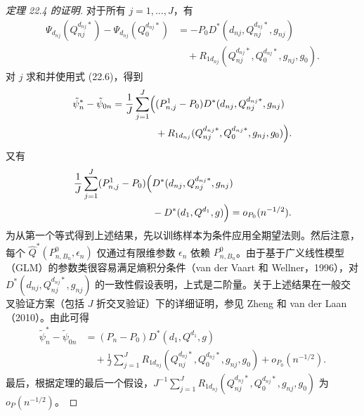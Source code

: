 \begin{proof}[定理 22.4 的证明]
对于所有 $j=1,\ldots,J$，有
\[
\begin{aligned}
 \Psi_{d_{nj}}(Q_{nj}^{d_{nj}*})-\Psi_{d_{nj}}(Q_0^{d_{nj}*})
 &=-P_0D^*(d_{nj},Q_{nj}^{d_{nj}*},g_{nj})\\
 &\quad+R_{1d_{nj}}(Q_{nj}^{d_{nj}*},Q_0^{d_{nj}*},g_{nj},g_0).
\end{aligned}
\]
对 $j$ 求和并使用式 (22.6)，得到
\[
\begin{aligned}
 \tilde\psi_n^*-\tilde\psi_{0n}
 =\frac1J\sum_{j=1}^J\Bigl(
 &(P_{n,j}^1-P_0)D^*(d_{nj},Q_{nj}^{d_{nj}*},g_{nj})\\
 &+R_{1d_{nj}}(Q_{nj}^{d_{nj}*},Q_0^{d_{nj}*},g_{nj},g_0)\Bigr).
\end{aligned}
\]
又有
\[
\begin{aligned}
 \frac1J\sum_{j=1}^J(P_{n,j}^1-P_0)\Bigl(
 &D^*(d_{nj},Q_{nj}^{d_{nj}*},g_{nj})\\
 &-D^*(d_1,Q^{d_1},g)\Bigr)=o_{P_0}(n^{-1/2}).
\end{aligned}
\]
为从第一个等式得到上述结果，先以训练样本为条件应用全期望法则。然后注意，每个 $\hat Q^*(P_{n,B_n}^0,\epsilon_n)$ 仅通过有限维参数 $\epsilon_n$ 依赖 $P_{n,B_n}^0$。由于基于广义线性模型（GLM）的参数类很容易满足熵积分条件（van der Vaart 和 Wellner，1996），对 $D^*(d_{nj},Q_{nj}^{d_{nj}*},g_{nj})$ 的一致性假设表明，上式是二阶量。关于上述结果在一般交叉验证方案（包括 $J$ 折交叉验证）下的详细证明，参见 Zheng 和 van der Laan（2010）。由此可得
\[
\begin{aligned}
 \tilde\psi_n^*-\tilde\psi_{0n}
 &=(P_n-P_0)D^*(d_1,Q^{d_1},g)\\
 &\quad+\frac1J\sum_{j=1}^JR_{1d_{nj}}(Q_{nj}^{d_{nj}*},Q_0^{d_{nj}*},g_{nj},g_0)
 +o_{P_0}(n^{-1/2}).
\end{aligned}
\]
最后，根据定理的最后一个假设，$J^{-1}\sum_{j=1}^JR_{1d_{nj}}(Q_{nj}^{d_{nj}*},Q_0^{d_{nj}*},g_{nj},g_0)$ 为 $o_P(n^{-1/2})$。
\end{proof}

